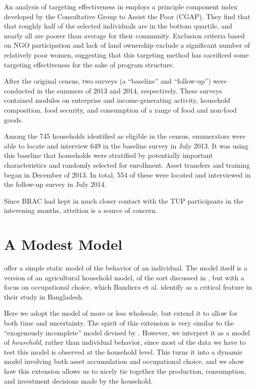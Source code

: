 \documentclass[11pt]{article}
\begin{document}
An analysis of targeting effectiveness in \cite{chowdhury-morel15}
employs a principle component index developed by the Consultative
Group to Assist the Poor (CGAP). They find that that roughly half of
the selected individuals are in the bottom quartile, and nearly all
are poorer than average for their community. Exclusion criteria
based on NGO participation and lack of land ownership exclude a
significant number of relatively poor women, suggesting that this
targeting method has sacrificed some targeting effectiveness for the
sake of program structure.

After the original census, two surveys (a ``baseline'' and
``follow-up'') were conducted in the summers of 2013 and 2014,
respectively.  These surveys contained modules on enterprise and
income-generating activity, household composition, food security,
and consumption of a range of food and non-food goods.

Among the 745 households identified as eligible in the census,
enumerators were able to locate and interview 649 in the baseline
survey in July 2013. It was using this baseline that households were stratified by
potentially important characteristics and randomly selected for enrollment. Asset
transfers and training began in December of 2013. In total, 554 of these were
located and interviewed in the follow-up survey in July 2014. 

Since BRAC had kept in much closer contact with the TUP participants in the
intevening months, attrition is a source of concern.

\section*{A Modest Model}
\label{sec-4}

\cite{bandiera2017} offer a simple static model of the behavior of
an individual.  The model itself is a version of an agricultural
household model, of the sort discussed in \cite{Singh-etal86}, but
with a focus on occupational choice, which Bandiera et al. identify as a 
critical feature in their study in Bangladesh.

Here we adopt the model of \cite{bandiera2017} more or less
wholesale, but extend it to allow for both time and uncertainty.  The
spirit of this extension is very similar to the ``exogenously
incomplete'' model devised by \cite{Karaivanov-Townsend14}.  However,
we interpret it as a model of \emph{household}, rather than
individual behavior, since most of the data we have to test this
model is observed at the household level.  This turns it into a
dynamic model involving both asset accumulation and occupational
choice, and we show how this extension allows us to nicely tie
together the production, consumption, and investment decisions made
by the household.
\end{document}
